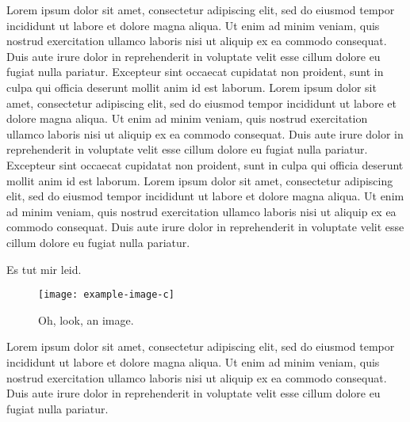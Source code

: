 \documentclass[20pt]{beamer}
\newlength{\colwidth}
\newlength{\bigcolwidth}
\begin{document}
\begin{frame}[t]
\begin{columns}[t]
\begin{column}{\bigcolwidth}
\begin{tcolorbox}[title=Etwas, every float=\centering]
Lorem ipsum dolor sit amet, consectetur adipiscing elit, sed do eiusmod tempor incididunt ut labore et dolore magna aliqua. 
Ut enim ad minim veniam, quis nostrud exercitation ullamco laboris nisi ut aliquip ex ea commodo consequat. 
Duis aute irure dolor in reprehenderit in voluptate velit esse cillum dolore eu fugiat nulla pariatur. 
Excepteur sint occaecat cupidatat non proident, sunt in culpa qui officia deserunt mollit anim id est laborum. 
Lorem ipsum dolor sit amet, consectetur adipiscing elit, sed do eiusmod tempor incididunt ut labore et dolore magna aliqua. 
Ut enim ad minim veniam, quis nostrud exercitation ullamco laboris nisi ut aliquip ex ea commodo consequat. 
Duis aute irure dolor in reprehenderit in voluptate velit esse cillum dolore eu fugiat nulla pariatur. 
Excepteur sint occaecat cupidatat non proident, sunt in culpa qui officia deserunt mollit anim id est laborum. 
Lorem ipsum dolor sit amet, consectetur adipiscing elit, sed do eiusmod tempor incididunt ut labore et dolore magna aliqua. 
Ut enim ad minim veniam, quis nostrud exercitation ullamco laboris nisi ut aliquip ex ea commodo consequat. 
Duis aute irure dolor in reprehenderit in voluptate velit esse cillum dolore eu fugiat nulla pariatur. 

Es tut mir leid.

\begin{figure}[htb]
\centering
\texttt{[image: example-image-c]}
\caption{Oh, look, an image.}
\end{figure}

\end{tcolorbox}

\begin{tcolorbox}[title=Etwas]
Lorem ipsum dolor sit amet, consectetur adipiscing elit, sed do eiusmod tempor incididunt ut labore et dolore magna aliqua. 
Ut enim ad minim veniam, quis nostrud exercitation ullamco laboris nisi ut aliquip ex ea commodo consequat. 
Duis aute irure dolor in reprehenderit in voluptate velit esse cillum dolore eu fugiat nulla pariatur. 


\end{tcolorbox}
\end{column}
\end{columns}
\end{frame}
\end{document}
